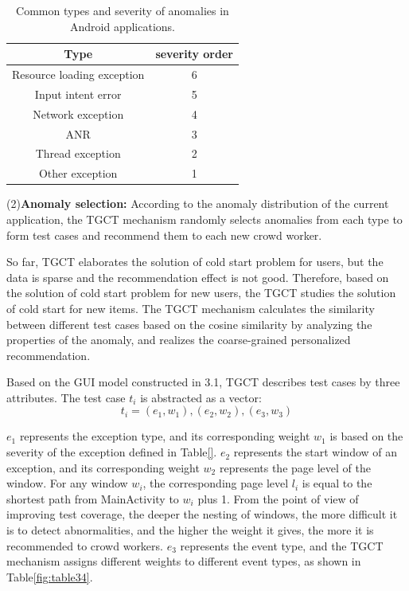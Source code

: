 \begin{table}[tb]
\caption{Common types and severity of anomalies in Android applications.}
\begin{center}
\begin{tabular}{|c|c|} %
\hline 
Type&severity order\\
\hline  
Resource loading exception&6\\
\hline 
Input intent error&5\\
\hline 
Network exception&4\\
\hline 
ANR&3\\
\hline 
Thread exception&2\\
\hline 
Other exception&1\\
\hline
\end{tabular}
\label{fig:table33}
\end{center}
\end{table}
 
(2)\textbf{Anomaly selection:} According to the anomaly distribution of the current application, the TGCT mechanism randomly selects anomalies from each type to form test cases and recommend them to each new crowd worker.

So far, TGCT elaborates the solution of cold start problem for users, but the data is sparse and the recommendation effect is not good. Therefore, based on the solution of cold start problem for new users, the TGCT studies the solution of cold start for new items. The TGCT mechanism calculates the similarity between different test cases based on the cosine similarity by analyzing the properties of the anomaly, and realizes the coarse-grained personalized recommendation.

Based on the GUI model constructed in 3.1, TGCT describes test cases by three attributes. The test case $t_{i}$ is abstracted as a vector:
\begin{equation}
t_{i} = {(e_{1}, w_{1}),(e_{2}, w_{2}),(e_{3}, w_{3})}
\end{equation}

$e_{1}$ represents the exception type, and its corresponding weight $w_{1}$ is based on the severity of the exception defined in Table\ref{}. $e_{2}$ represents the start window of an exception, and its corresponding weight $w_{2}$ represents the page level of the window. For any window $w_{i}$, the corresponding page level $l_{i}$ is equal to the shortest path from MainActivity to $w_{i}$ plus 1. From the point of view of improving test coverage, the deeper the nesting of windows, the more difficult it is to detect abnormalities, and the higher the weight it gives, the more it is recommended to crowd workers. $e_{3}$ represents the event type, and the TGCT mechanism assigns different weights to different event types, as shown in Table\ref{fig:table34}.

